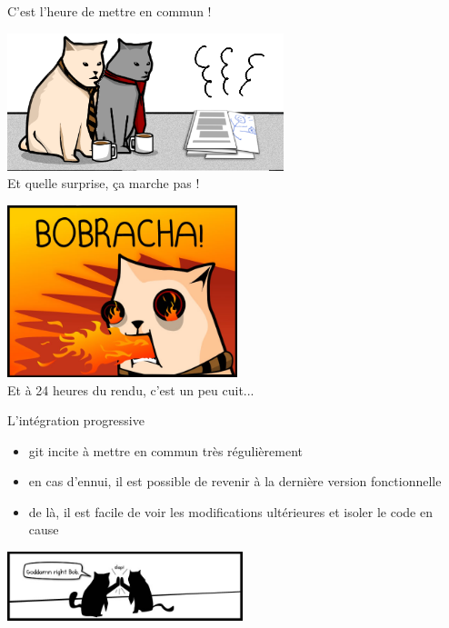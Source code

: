 \documentclass{beamer}
\begin{document}
\begin{frame}{C'est l'heure de mettre en commun !}
	\begin{center}
		\includegraphics[height=4cm]{img/bob_bob2}\\
		\Large{Et quelle surprise, ça marche pas !}
	\end{center}
\end{frame}

\begin{frame}
	\begin{center}
		\includegraphics[height=5cm]{img/bobracha}\\
		\Large{Et à 24 heures du rendu, c'est un peu cuit...}
	\end{center}
\end{frame}

\begin{frame}{L'intégration progressive}
	\begin{itemize}
		\item git incite à mettre en commun très régulièrement
		\item en cas d'ennui, il est possible de revenir à la dernière version fonctionnelle
		\item de là, il est facile de voir les modifications ultérieures et isoler le code en cause
	\end{itemize}
	\begin{center}
		\includegraphics[height=2cm]{img/ok_bob}
	\end{center}
\end{frame}
\end{document}
